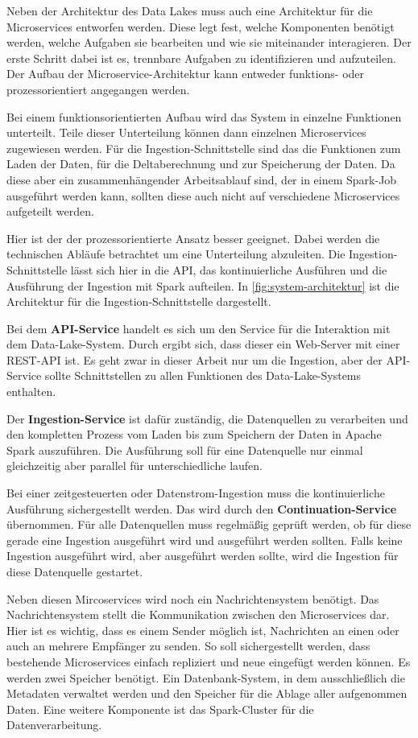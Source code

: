Neben der Architektur des Data Lakes muss auch eine Architektur für die Microservices entworfen werden.
Diese legt fest, welche Komponenten benötigt werden, welche Aufgaben sie bearbeiten und wie sie miteinander interagieren.
Der erste Schritt dabei ist es, trennbare Aufgaben zu identifizieren und aufzuteilen.
Der Aufbau der Microservice-Architektur kann entweder funktions- oder prozessorientiert angegangen werden.

Bei einem funktionsorientierten Aufbau wird das System in einzelne Funktionen unterteilt.
Teile dieser Unterteilung können dann einzelnen Microservices zugewiesen werden.
Für die Ingestion-Schnittstelle sind das die Funktionen zum Laden der Daten, für die Deltaberechnung und zur Speicherung der Daten.
Da diese aber ein zusammenhängender Arbeitsablauf sind, der in einem Spark-Job ausgeführt werden kann, sollten diese auch nicht auf verschiedene Microservices aufgeteilt werden.

Hier ist der der prozessorientierte Ansatz besser geeignet.
Dabei werden die technischen Abläufe betrachtet um eine Unterteilung abzuleiten.
Die Ingestion-Schnittstelle lässt sich hier in die API, das kontinuierliche Ausführen und die Ausführung der Ingestion mit Spark aufteilen.
In \cref{fig:system-architektur} ist die Architektur für die Ingestion-Schnittstelle dargestellt.

Bei dem \textbf{API-Service} handelt es sich um den Service für die Interaktion mit dem Data-Lake-System.
Durch  ergibt sich, dass dieser ein Web-Server mit einer REST-API ist.
Es geht zwar in dieser Arbeit nur um die Ingestion, aber der API-Service sollte Schnittstellen zu allen Funktionen des Data-Lake-Systems enthalten.

Der \textbf{Ingestion-Service} ist dafür zuständig, die Datenquellen zu verarbeiten und den kompletten Prozess vom Laden bis zum Speichern der Daten in Apache Spark auszuführen.
Die Ausführung soll für eine Datenquelle nur einmal gleichzeitig aber parallel für unterschiedliche laufen.

Bei einer zeitgesteuerten oder Datenstrom-Ingestion muss die kontinuierliche Ausführung sichergestellt werden.
Das wird durch den \textbf{Continuation-Service} übernommen.
Für alle Datenquellen muss regelmäßig geprüft werden, ob für diese gerade eine Ingestion ausgeführt wird und ausgeführt werden sollten.
Falls keine Ingestion ausgeführt wird, aber ausgeführt werden sollte, wird die Ingestion für diese Datenquelle gestartet.

Neben diesen Mircoservices wird noch ein Nachrichtensystem benötigt.
Das Nachrichtensystem stellt die Kommunikation zwischen den Microservices dar.
Hier ist es wichtig, dass es einem Sender möglich ist, Nachrichten an einen oder auch an mehrere Empfänger zu senden.
So soll sichergestellt werden, dass bestehende Microservices einfach repliziert und neue eingefügt werden können.
Es werden zwei Speicher benötigt.
Ein Datenbank-System, in dem ausschließlich die Metadaten verwaltet werden und den Speicher für die Ablage aller aufgenommen Daten.
Eine weitere Komponente ist das Spark-Cluster für die Datenverarbeitung.

